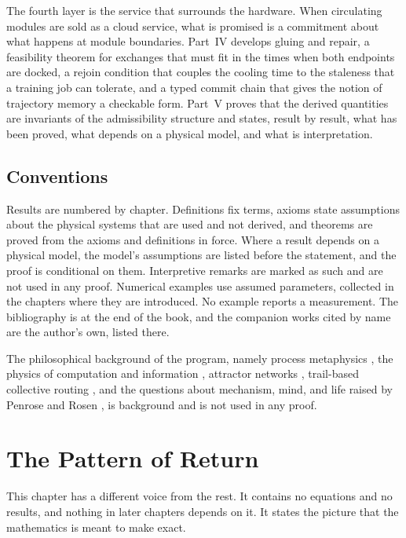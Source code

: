 \documentclass[11pt,openany]{book}
\theoremstyle{plain}
\theoremstyle{definition}
\theoremstyle{remark}
\begin{document}
The fourth layer is the service that surrounds the hardware. When circulating modules are sold as a cloud service, what is promised is a commitment about what happens at module boundaries. Part~IV develops gluing and repair, a feasibility theorem for exchanges that must fit in the times when both endpoints are docked, a rejoin condition that couples the cooling time to the staleness that a training job can tolerate, and a typed commit chain that gives the notion of trajectory memory a checkable form. Part~V proves that the derived quantities are invariants of the admissibility structure and states, result by result, what has been proved, what depends on a physical model, and what is interpretation.


\section{Conventions}

Results are numbered by chapter. Definitions fix terms, axioms state assumptions about the physical systems that are used and not derived, and theorems are proved from the axioms and definitions in force. Where a result depends on a physical model, the model's assumptions are listed before the statement, and the proof is conditional on them. Interpretive remarks are marked as such and are not used in any proof. Numerical examples use assumed parameters, collected in the chapters where they are introduced. No example reports a measurement. The bibliography is at the end of the book, and the companion works cited by name are the author's own, listed there.

The philosophical background of the program, namely process metaphysics \cite{whitehead,bergson,rescher}, the physics of computation and information \cite{landauer,jaynes,kolmogorov}, attractor networks \cite{hopfield}, trail-based collective routing \cite{dorigo}, and the questions about mechanism, mind, and life raised by Penrose and Rosen \cite{penrose,rosen}, is background and is not used in any proof.

\chapter{The Pattern of Return}
\label{ch:prelude}

\noindent
This chapter has a different voice from the rest. It contains no equations and no results, and nothing in later chapters depends on it. It states the picture that the mathematics is meant to make exact.
\end{document}
